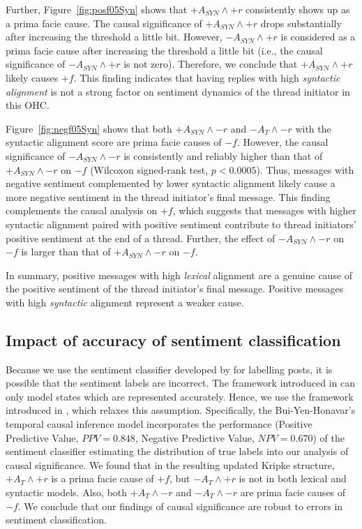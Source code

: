 \documentclass[man,biblatex,floatsintext]{apa6}
\begin{document}
Further, Figure~\ref{fig:posf05Syn} shows that $+A_{SYN} \wedge +r$ consistently shows up as a prima facie cause. The causal significance of $+A_{SYN} \wedge +r$ drops substantially after increasing the threshold a little bit. However, $-A_{SYN} \wedge +r$ is considered as a prima facie cause after increasing the threshold a little bit (i.e., the causal significance of $-A_{SYN} \wedge +r$ is not zero). Therefore, we conclude that $+A_{SYN} \wedge +r$ likely causes $+f$. This finding indicates that having replies with high \emph{syntactic alignment} is not a strong factor on sentiment dynamics of the thread initiator in this OHC.

Figure~\ref{fig:negf05Syn} shows that both $+A_{SYN} \wedge -r$ and $-A_T \wedge -r$ with the syntactic alignment score are prima facie causes of $-f$. However, the causal significance of $-A_{SYN} \wedge -r$ is consistently and reliably higher than that of $+A_{SYN} \wedge -r$ on $-f$ (Wilcoxon signed-rank test, $p<0.0005$). Thus, messages with negative sentiment complemented by lower syntactic alignment likely cause a more negative sentiment in the thread initiator's final message. This finding complements the causal analysis on $+f$, which suggests that messages with higher syntactic alignment paired with positive sentiment contribute to thread initiators' positive sentiment at the end of a thread. Further, the effect of $-A_{SYN} \wedge -r$ on $-f$ is larger than that of $+A_{SYN} \wedge -r$ on $-f$.

In summary, positive messages with high \emph{lexical} alignment are a genuine cause of the positive sentiment of the thread initiator's final message. Positive messages with high \emph{syntactic} alignment represent a weaker cause.


\subsection{Impact of accuracy of sentiment classification}

Because we use the sentiment classifier developed by \textcite{qiu2011get} for labelling posts, it is possible that the sentiment labels are incorrect. The  framework introduced in \textcite{kleinberg_uai09} can only model states which are represented accurately. Hence, we use the framework introduced in \textcite{bui2016temporal}, which relaxes this assumption. Specifically, the Bui-Yen-Honavar's temporal causal inference model incorporates the performance (Positive Predictive Value, $PPV=0.848$, Negative Predictive Value, $NPV= 0.670$) of the sentiment classifier estimating the distribution of true labels into our analysis of causal significance. 
We found that in the resulting updated Kripke structure, $+A_T \wedge +r$ is a prima facie cause of $+f$, but $-A_T \wedge +r$ is not in both lexical and syntactic models. Also, both $+A_T \wedge -r$ and $-A_T \wedge -r$ are prima facie causes of $-f$. We conclude that our findings of causal significance are robust to errors in sentiment classification.
\end{document}
